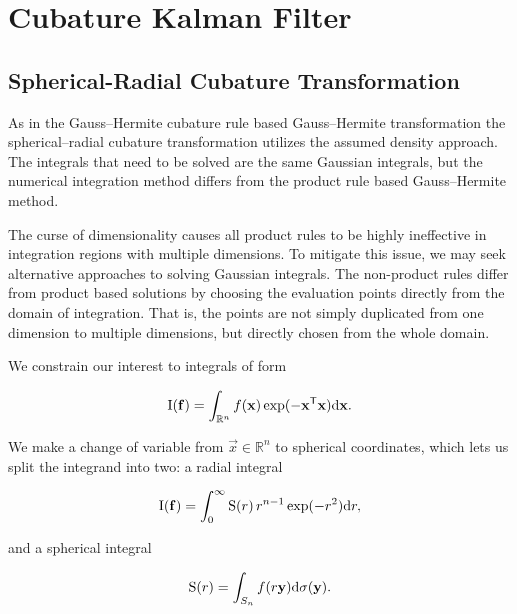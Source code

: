\newpage
%
\section{Cubature Kalman Filter}
%

\subsection{Spherical-Radial Cubature Transformation}

As in the Gauss--Hermite cubature rule based Gauss--Hermite transformation the spherical--radial cubature transformation utilizes the assumed density approach. The integrals that need to be solved are the same Gaussian integrals, but the numerical integration method differs from the product rule based Gauss--Hermite method.

The curse of dimensionality causes all product rules to be highly ineffective in integration regions with multiple dimensions. To mitigate this issue, we may seek alternative approaches to solving Gaussian integrals. The non-product rules differ from product based solutions by choosing the evaluation points directly from the domain of integration. That is, the points are not simply duplicated from one dimension to multiple dimensions, but directly chosen from the whole domain.

We constrain our interest to integrals of form

\begin{equation} \label{eqAlmostgaussian}
    \operatorname{I}(\mathbf{f}) = \int_{\mathbb{R}^n} f(\mathbf{x})\exp(-\mathbf{x}\mathsf{^T}\mathbf{x})\mathrm{d}\mathbf{x}.
\end{equation}

\noindent%
We make a change of variable from $\vec{x} \in \mathbb{R}^n$ to spherical coordinates, which lets us split the integrand into two: a radial integral

\begin{equation} \label{eqRadial}
    \operatorname{I}(\mathbf{f}) = \int_0^\infty \operatorname{S}(r) \, r^{n-1} \exp(-r^2) \mathrm{d} r,
\end{equation}

\noindent%
and a spherical integral

\begin{equation} \label{eqSpherical}
    \operatorname{S}(r) = \int_{S_n} f(r\mathbf{y}) \mathrm{d}\sigma(\mathbf{y}).
\end{equation}

